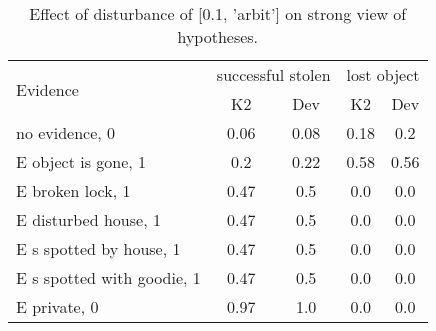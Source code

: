 \begin{table}\begin{tabular}{l|cc|cc}\toprule\multirow{2}{*}{Evidence} & \multicolumn{2}{c}{successful stolen}& \multicolumn{2}{c}{lost object}\\& {K2} & {Dev}& {K2} & {Dev}\\\midrule
no evidence, 0 & 0.06&0.08&0.18&0.2\\E object is gone, 1 & 0.2&0.22&0.58&0.56\\E broken lock, 1 & 0.47&0.5&0.0&0.0\\E disturbed house, 1 & 0.47&0.5&0.0&0.0\\E s spotted by house, 1 & 0.47&0.5&0.0&0.0\\E s spotted with goodie, 1 & 0.47&0.5&0.0&0.0\\E private, 0 & 0.97&1.0&0.0&0.0\\\bottomrule\end{tabular}\caption{Effect of disturbance of [0.1, 'arbit'] on strong view of hypotheses.}\end{table}